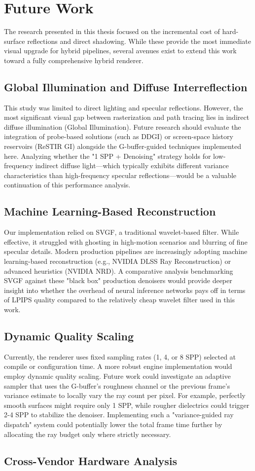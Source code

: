 \documentclass[12pt,a4paper]{report}
\newcommand{\daechapter}[1]{
  \chapter{#1}
}
\newcommand{\daesection}[1]{
  \section{#1}
}
\begin{document}
\daechapter{Future Work}
The research presented in this thesis focused on the incremental cost of hard-surface reflections and direct shadowing. While these provide the most immediate visual upgrade for hybrid pipelines,
several avenues exist to extend this work toward a fully comprehensive hybrid renderer.

\daesection{Global Illumination and Diffuse Interreflection}
This study was limited to direct lighting and specular reflections. However, the most significant visual gap between rasterization and path tracing lies in indirect diffuse illumination (Global Illumination).
Future research should evaluate the integration of probe-based solutions (such as DDGI) or screen-space history reservoirs (ReSTIR GI) alongside the G-buffer-guided techniques implemented here.
Analyzing whether the "1 SPP + Denoising" strategy holds for low-frequency indirect diffuse light—which typically exhibits different variance characteristics than high-frequency specular reflections—would be a valuable
continuation of this performance analysis.

\daesection{Machine Learning-Based Reconstruction}
Our implementation relied on SVGF, a traditional wavelet-based filter. While effective, it struggled with ghosting in high-motion scenarios and blurring of fine specular details.
Modern production pipelines are increasingly adopting machine learning-based reconstruction (e.g., NVIDIA DLSS Ray Reconstruction) or advanced heuristics (NVIDIA NRD).
A comparative analysis benchmarking SVGF against these "black box" production denoisers would provide deeper insight into whether the overhead of neural inference networks
pays off in terms of LPIPS quality compared to the relatively cheap wavelet filter used in this work.

\daesection{Dynamic Quality Scaling}
Currently, the renderer uses fixed sampling rates (1, 4, or 8 SPP) selected at compile or configuration time. A more robust engine implementation would employ dynamic quality scaling.
Future work could investigate an adaptive sampler that uses the G-buffer's roughness channel or the previous frame's variance estimate to locally vary the ray count per pixel. For example,
perfectly smooth surfaces might require only 1 SPP, while rougher dielectrics could trigger 2-4 SPP to stabilize the denoiser. Implementing such a "variance-guided ray dispatch" system could potentially
lower the total frame time further by allocating the ray budget only where strictly necessary.

\daesection{Cross-Vendor Hardware Analysis}
\end{document}
